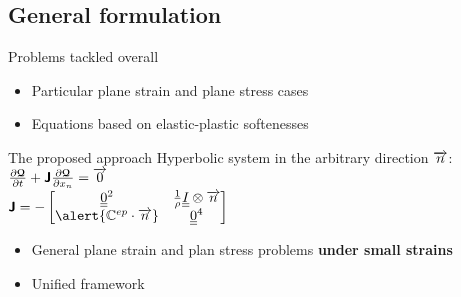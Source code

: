 \subsection{General formulation}
\begin{frame}
  \begin{block}{Problems tackled overall}
    \begin{itemize}
    \item Particular plane strain and plane stress cases \cite{Bleich,Ting69,Ting73,Li_planeStress_EP}
    \item Equations based on elastic-plastic softenesses
    
    \end{itemize}
  \end{block}
  \begin{block}{The proposed approach}
    Hyperbolic system in the arbitrary direction ${\overrightarrow{n}}$: $\frac{\partial {\boldsymbol{\mathcal{Q}}}}{\partial t} + \boldsymbol{\mathsf{J}} \frac{\partial {\boldsymbol{\mathcal{Q}}}}{\partial x_n} ={\overrightarrow{0}}$ \\
    $\Jbsf=-\matrice{\tens{0}^2 & \frac{1}{\rho}\tens{I}\otimes\vect{n} \\ \alert{\Cbb^{ep}\cdot \vect{n}} & \tens{0}^4}$
    \begin{itemize}
    \item General plane strain and plan stress problems \textbf{under small strains}
    \item Unified framework
    \end{itemize}
  \end{block}
\end{frame}

